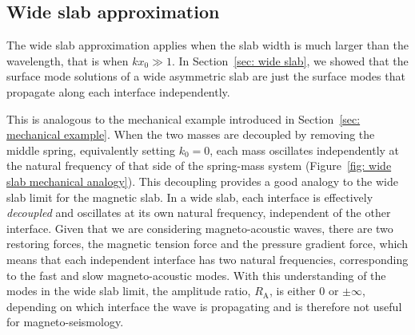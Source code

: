 \subsection{Wide slab approximation} \label{sec: AR wide slab}
The wide slab approximation applies when the slab width is much larger than the wavelength, that is when $kx_0 \gg 1$. In Section~\ref{sec: wide slab}, we showed that the surface mode solutions of a wide asymmetric slab are just the surface modes that propagate along each interface independently.

This is analogous to the mechanical example introduced in Section~\ref{sec: mechanical example}. When the two masses are decoupled by removing the middle spring, equivalently setting $k_0 = 0$, each mass oscillates independently at the natural frequency of that side of the spring-mass system (Figure~\ref{fig: wide slab mechanical analogy}). This decoupling provides a good analogy to the wide slab limit for the magnetic slab. In a wide slab, each interface is effectively \textit{decoupled} and oscillates at its own natural frequency, independent of the other interface. Given that we are considering magneto-acoustic waves, there are two restoring forces, the magnetic tension force and the pressure gradient force, which means that each independent interface has two natural frequencies, corresponding to the fast and slow magneto-acoustic modes. With this understanding of the modes in the wide slab limit, the amplitude ratio, $R_\textrm{A}$, is either $0$ or $\pm\infty$, depending on which interface the wave is propagating and is therefore not useful for magneto-seismology.


